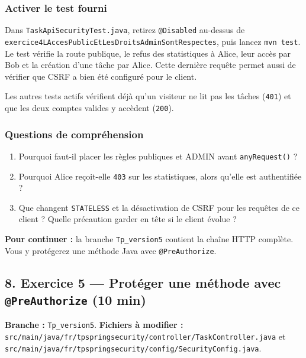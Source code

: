 \documentclass[
  french,
  10pt,
  a4paper,
]{article}
\providecommand{\tightlist}{%
  \setlength{\itemsep}{0pt}\setlength{\parskip}{0pt}}
\begin{document}
\subsubsection{Activer le test fourni}\label{activer-le-test-fourni}

Dans \texttt{TaskApiSecurityTest.java}, retirez \texttt{@Disabled}
au-dessus de
\texttt{exercice4LAccesPublicEtLesDroitsAdminSontRespectes}, puis lancez
\texttt{mvn\ test}. Le test vérifie la route publique, le refus des
statistiques à Alice, leur accès par Bob et la création d'une tâche par
Alice. Cette dernière requête permet aussi de vérifier que CSRF a bien
été configuré pour le client.

Les autres tests actifs vérifient déjà qu'un visiteur ne lit pas les
tâches (\texttt{401}) et que les deux comptes valides y accèdent
(\texttt{200}).

\subsubsection{Questions de
compréhension}\label{questions-de-compruxe9hension-2}

\begin{enumerate}
\def\labelenumi{\arabic{enumi}.}
\tightlist
\item
  Pourquoi faut-il placer les règles publiques et ADMIN avant
  \texttt{anyRequest()} ?
\item
  Pourquoi Alice reçoit-elle \texttt{403} sur les statistiques, alors
  qu'elle est authentifiée ?
\item
  Que changent \texttt{STATELESS} et la désactivation de CSRF pour les
  requêtes de ce client ? Quelle précaution garder en tête si le client
  évolue ?
\end{enumerate}

\textbf{Pour continuer :} la branche \texttt{Tp\_version5} contient la
chaîne HTTP complète. Vous y protégerez une méthode Java avec
\texttt{@PreAuthorize}.

\subsection{\texorpdfstring{8. Exercice 5 --- Protéger une méthode avec
\texttt{@PreAuthorize} (10
min)}{8. Exercice 5 --- Protéger une méthode avec @PreAuthorize (10 min)}}\label{exercice-5-protuxe9ger-une-muxe9thode-avec-preauthorize-10-min}

\textbf{Branche :} \texttt{Tp\_version5}. \textbf{Fichiers à modifier :}
\texttt{src/main/java/fr/tpspringsecurity/controller/TaskController.java}
et
\texttt{src/main/java/fr/tpspringsecurity/config/SecurityConfig.java}.
\end{document}
